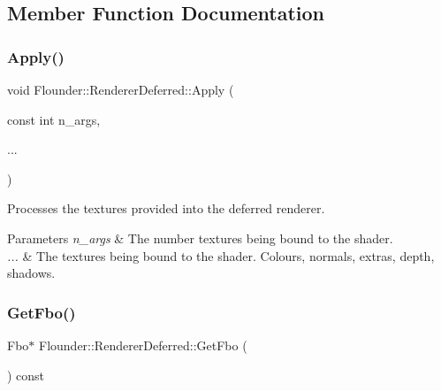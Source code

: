 \subsection{Member Function Documentation}
\mbox{\label{class_flounder_1_1_renderer_deferred_a1597b1d0f702dcfa0f3d20a7510fce24}} 
\subsubsection{\texorpdfstring{Apply()}{Apply()}}
{\footnotesize\ttfamily void Flounder\+::\+Renderer\+Deferred\+::\+Apply (\begin{DoxyParamCaption}\item[{const int}]{n\+\_\+args,  }\item[{}]{... }\end{DoxyParamCaption})}



Processes the textures provided into the deferred renderer. 


\begin{DoxyParams}{Parameters}
{\em n\+\_\+args} & The number textures being bound to the shader. \\
\hline
{\em ...} & The textures being bound to the shader. Colours, normals, extras, depth, shadows. \\
\hline
\end{DoxyParams}
\mbox{\label{class_flounder_1_1_renderer_deferred_a842c246532630c2d90e064d13c18dd30}} 
\subsubsection{\texorpdfstring{Get\+Fbo()}{GetFbo()}}
{\footnotesize\ttfamily Fbo$\ast$ Flounder\+::\+Renderer\+Deferred\+::\+Get\+Fbo (\begin{DoxyParamCaption}{ }\end{DoxyParamCaption}) const\hspace{0.3cm}{\ttfamily [inline]}}



